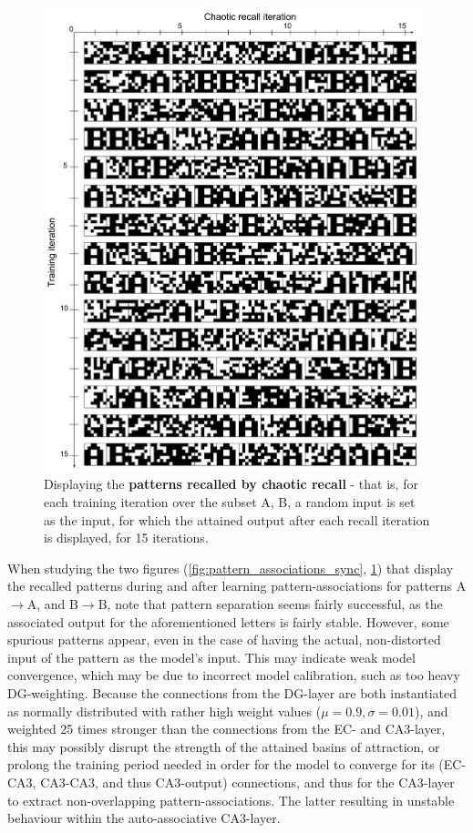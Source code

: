 \begin{figure}
    \centering
    \includegraphics[width=11cm]{fig/AB-chaotic-recall-sync-tm0-dgw25}
    \caption{Displaying the \textbf{patterns recalled by chaotic recall} - that is, for each training iteration over the subset {A, B}, a random input is set as the input, for which the attained output after each recall iteration is displayed, for 15 iterations.}
    \label{fig:chaotic_recall_sync}
\end{figure}

When studying the two figures (\ref{fig:pattern_associations_sync}, \ref{fig:chaotic_recall_sync}) that display the recalled patterns during and after learning pattern-associations for patterns A$\rightarrow$A, and B$\rightarrow$B, note that pattern separation seems fairly successful, as the associated output for the aforementioned letters is fairly stable. However, some spurious patterns appear, even in the case of having the actual, non-distorted input of the pattern as the model's input. This may indicate weak model convergence, which may be due to incorrect model calibration, such as too heavy DG-weighting. Because the connections from the DG-layer are both instantiated as normally distributed with rather high weight values ($\mu=0.9, \sigma=0.01$), and weighted 25 times stronger than the connections from the EC- and CA3-layer, this may possibly disrupt the strength of the attained basins of attraction, or prolong the training period needed in order for the model to converge for its (EC-CA3, CA3-CA3, and thus CA3-output) connections, and thus for the CA3-layer to extract non-overlapping pattern-associations. The latter resulting in unstable behaviour within the auto-associative CA3-layer. 

